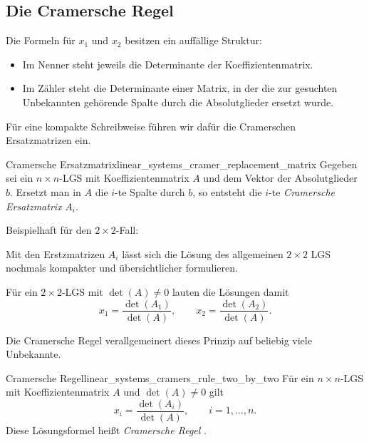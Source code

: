 \subsection{Die Cramersche Regel}
\label{subsec:linear_systems_cramers_rule}

Die Formeln für $x_1$ und $x_2$ besitzen ein auffällige Struktur:
\begin{itemize}
  \item Im Nenner steht jeweils die Determinante der Koeffizientenmatrix.
  \item Im Zähler steht die Determinante einer Matrix, in der die zur
  gesuchten Unbekannten gehörende Spalte durch die Absolutglieder ersetzt wurde.
\end{itemize}
Für eine kompakte Schreibweise führen wir dafür die Cramerschen Ersatzmatrizen ein.

\begin{DefinitionBox}{Cramersche Ersatzmatrix}{linear_systems_cramer_replacement_matrix}
  Gegeben sei ein $n\times n$-LGS mit Koeffizientenmatrix $A$ und dem Vektor
  der Absolutglieder $b$. Ersetzt man in $A$ die $i$-te Spalte durch $b$, so
  entsteht die $i$-te \emph{Cramersche Ersatzmatrix}
   $A_i$.
  \par\medskip
  Beispielhaft für den $2\times2$-Fall:
  \begin{center}
  \end{center}
\end{DefinitionBox}

Mit den Erstzmatrizen $A_i$ lässt sich die Lösung des allgemeinen $2 \times 2$ LGS
nochmals kompakter und übersichtlicher formulieren.
%
\begin{samepage}
Für ein $2\times2$-LGS mit $\det(A)\neq0$ lauten die Lösungen damit
\[
  x_1=\frac{\det(A_1)}{\det(A)},
  \qquad
  x_2=\frac{\det(A_2)}{\det(A)}.
\]

Die Cramersche Regel verallgemeinert dieses Prinzip auf beliebig viele Unbekannte.
\begin{TheoremBox}{Cramersche Regel}{linear_systems_cramers_rule_two_by_two}
  Für ein $n\times n$-LGS mit Koeffizientenmatrix $A$ und $\det(A)\neq0$
  gilt
  \[
    x_i=\frac{\det(A_i)}{\det(A)},
    \qquad i=1,\dots,n.
  \]
  Diese Lösungsformel heißt \emph{Cramersche Regel}
  .
\end{TheoremBox}
\end{samepage}

